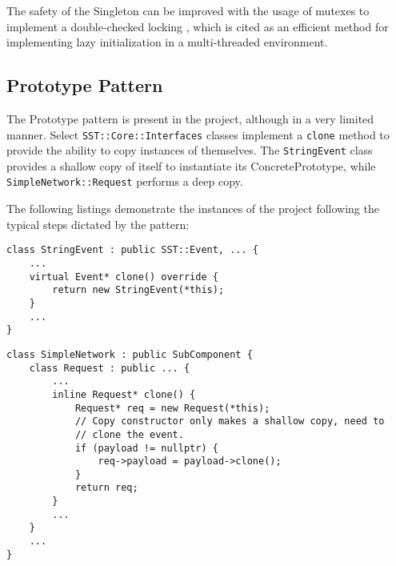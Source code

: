The safety of the Singleton can be improved with the usage of mutexes to implement a double-checked locking \cite{dcl}, which is cited as an efficient method for implementing lazy initialization in a multi-threaded environment.


\subsection{Prototype Pattern}
The Prototype pattern is present in the project, although in a very limited manner. Select \texttt{SST::Core::Interfaces} classes implement a \texttt{clone} method to provide the ability to copy instances of themselves. The \texttt{StringEvent} class provides a shallow copy of itself to instantiate its ConcretePrototype, while \texttt{SimpleNetwork::Request} performs a deep copy.

The following listings demonstrate the instances of the project following the typical steps dictated by the pattern:

\begin{lstlisting}[style=customC++,label=prototype1,caption=StringEvent Implementing the Prototype Pattern]
class StringEvent : public SST::Event, ... {
    ...
    virtual Event* clone() override {
        return new StringEvent(*this);
    }
    ...
}
\end{lstlisting}

\begin{lstlisting}[style=customC++,label=prototype2,caption=SimpleNetwork::Request Implementing the Prototype Pattern]
class SimpleNetwork : public SubComponent {
    class Request : public ... {
        ...
        inline Request* clone() {
            Request* req = new Request(*this);
            // Copy constructor only makes a shallow copy, need to
            // clone the event.
            if (payload != nullptr) {
                req->payload = payload->clone();
            }
            return req;
        }
        ...
    }
    ...
}
\end{lstlisting}
